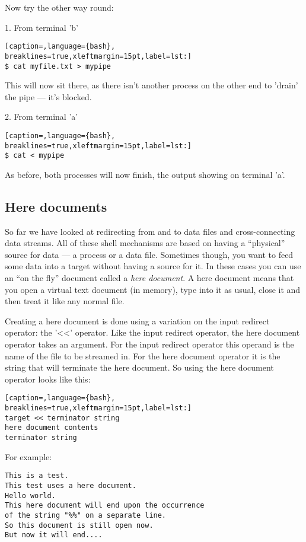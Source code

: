 Now try the other way round:

1. From terminal 'b'
\lstset{basicstyle=\scriptsize, numbers=left, captionpos=b, tabsize=4}
\begin{lstlisting}[caption=,language={bash},
breaklines=true,xleftmargin=15pt,label=lst:]
$ cat myfile.txt > mypipe
\end{lstlisting}

This will now sit there, as there isn't another process on the other end to
'drain' the pipe --- it's blocked.

2. From terminal 'a'
\lstset{basicstyle=\scriptsize, numbers=left, captionpos=b, tabsize=4}
\begin{lstlisting}[caption=,language={bash},
breaklines=true,xleftmargin=15pt,label=lst:]
$ cat < mypipe
\end{lstlisting}

As before, both processes will now finish, the output showing on terminal 'a'.

\subsection{Here documents}
So far we have looked at redirecting from and to data files and
cross-connecting data streams. All of these shell mechanisms are based on
having a ``physical'' source for data --- a process or a data file. Sometimes
though, you want to feed some data into a target without having a source for
it. In these cases you can use an ``on the fly'' document called a \emph{here
document}. A here document means that you open a virtual text document (in
memory), type into it as usual, close it and then treat it like any normal
file.

Creating a here document is done using a variation on the input redirect
operator: the '\textless{}\textless{}' operator. Like the input redirect
operator, the here document operator takes an argument. For the input redirect
operator this operand is the name of the file to be streamed in. For the here
document operator it is the string that will terminate the here document. So
using the here document operator looks like this:
\lstset{basicstyle=\scriptsize, numbers=left, captionpos=b, tabsize=4}
\begin{lstlisting}[caption=,language={bash},
breaklines=true,xleftmargin=15pt,label=lst:]
target << terminator string
here document contents
terminator string
\end{lstlisting}

For example: 
\scriptsize
\begin{verbatim}
This is a test.
This test uses a here document.
Hello world.
This here document will end upon the occurrence 
of the string "%%" on a separate line.
So this document is still open now.
But now it will end....
\end{verbatim}
\normalsize

